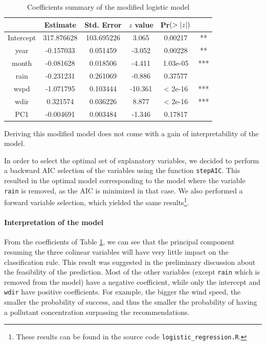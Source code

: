 \documentclass[a4paper, 12pt]{article}
\begin{document}
	\begin{table}[h]
	    \centering
	    \begin{tabular}{|c|c|c|c|c|c|}
    	    \cline{2-5}
    	    \multicolumn{1}{c|}{} & Estimate &  Std. Error &  $z$ value & Pr$(>\left|z\right|)$ & \multicolumn{1}{c}{} \\ \hline
    	    Intercept & 317.876628 & 103.695226 &  3.065 & 0.00217 & ** \\ \hline
    	    year & -0.157033 &  0.051459 & -3.052 & 0.00228 & ** \\ \hline
    	    month &  -0.081628 & 0.018506 & -4.411 & 1.03e-05 & *** \\ \hline
    	    rain & -0.231231 & 0.261069 & -0.886  &0.37577 & \\ \hline
    	    wspd & -1.071795 & 0.103444 & -10.361 & < 2e-16 & *** \\ \hline
    	    wdir & 0.321574 & 0.036226 & 8.877 & < 2e-16  & *** \\ \hline
    	    PC1 & -0.004691 &  0.003484 & -1.346  & 0.17817 &  \\ \hline
	    \end{tabular}
	    \caption{Coefficients summary of the modified logistic model}
	    \label{tab:modified_model_coeff}
	\end{table}
	
	Deriving this modified model does not come with a gain of interpretability of the model.
	
	In order to select the optimal set of explanatory variables, we decided to perform a backward AIC selection of the variables using the function \texttt{stepAIC}. This resulted in the optimal model corresponding to the model where the variable \texttt{rain} is removed, as the AIC is minimized in that case. We also performed a forward variable selection, which yielded the same results\footnote{These results can be found in the source code \texttt{logistic\_regression.R}.}.
	
	\paragraph{Interpretation of the model}
	From the coefficients of Table \ref{tab:modified_model_coeff}, we can see that the principal component resuming the three colinear variables will have very little impact on the classification rule. This result was suggested in the preliminary discussion about the feasibility of the prediction. Most of the other variables (except \texttt{rain} which is removed from the model) have a negative coefficient, while only the intercept and \texttt{wdir} have positive coefficients. For example, the bigger the wind speed, the smaller the probability of success, and thus the smaller the probability of having a pollutant concentration surpassing the recommendations. 
	
\end{document}
